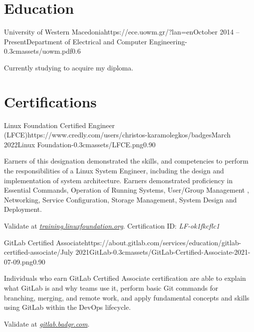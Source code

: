 \documentclass{mycv}
\begin{document}
	\section{Education}

	\begin{EntryDatedLogo}{University of Western Macedonia}{https://ece.uowm.gr/?lan=en}{October 2014 -- Present}{Department of Electrical and Computer Engineering}{-0.3cm}{assets/uowm.pdf}{0.6}
	\begin{Itemize}
		\item Currently studying to acquire my diploma.
	\end{Itemize}
	\end{EntryDatedLogo}

	\section{Certifications}
    \begin{EntryDatedLogo}{Linux Foundation Certified Engineer (LFCE)}{https://www.credly.com/users/christos-karamolegkos/badges}{March 2022}{Linux Foundation}{-0.3cm}{assets/LFCE.png}{0.90}
		\begin{Itemize}
			\item Earners of this designation demonstrated the skills, and competencies to perform the responsibilities of a Linux System Engineer, including the design and implementation of system architecture. Earners demonstrated proficiency in Essential Commands, Operation of Running Systems, User/Group Management , Networking, Service Configuration, Storage Management, System Design and Deployment. 
			\item Validate at \href{https://training.linuxfoundation.org/certification/verify-linux-certifications}{\textit{training.linuxfoundation.org}}. Certification ID: \textit{LF-ok1fkcflc1}
		\end{Itemize}
	\end{EntryDatedLogo}

	\vspace{0.75cm}

    \begin{EntryDatedLogo}{GitLab Certified Associate}{https://about.gitlab.com/services/education/gitlab-certified-associate/}{July 2021}{GitLab}{-0.3cm}{assets/GitLab-Certified-Associate-2021-07-09.png}{0.90}
		\begin{Itemize}
			\item Individuals who earn GitLab Certified Associate certification are able to explain what GitLab is and why teams use it, perform basic Git commands for branching, merging, and remote work, and apply fundamental concepts and skills using GitLab within the DevOps lifecycle. 
			\item Validate at \href{https://gitlab.badgr.com/public/assertions/Hw6j8Th9SyKNj8ehsQkqAw}{\textit{gitlab.badgr.com}}.
		\end{Itemize}
	\end{EntryDatedLogo}
	
\end{document}
